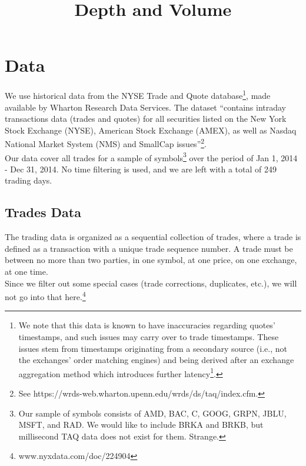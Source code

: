 \documentclass{article}
\begin{document}
\title{Depth and Volume}

\maketitle
\vspace{.5pc}

\section{Data}
We use historical data from the NYSE Trade and Quote database\footnote{We note that this data is known to have inaccuracies regarding quotes' timestamps, and such issues may carry over to trade timestamps. These issues stem from timestamps originating from a secondary source (i.e., not the exchanges' order matching engines) and being derived after an exchange aggregation method which introduces further latency\footnote{See Budish, Cramton and Shim (2015) and Ding, Hanna and Hendershott (2014)}.}, made available by Wharton Research Data Services. The dataset ``contains intraday transactions data (trades and quotes) for all securities listed on the New York Stock Exchange (NYSE), American Stock Exchange (AMEX), as well as Nasdaq National Market System (NMS) and SmallCap issues''\footnote{See https://wrds-web.wharton.upenn.edu/wrds/ds/taq/index.cfm.}.\\

Our data cover all trades for a sample of symbols\footnote{Our sample of symbols consists of AMD, BAC, C, GOOG, GRPN, JBLU, MSFT, and RAD. We would like to include BRKA and BRKB, but millisecond TAQ data does not exist for them. Strange.} over the period of Jan 1, 2014 - Dec 31, 2014. No time filtering is used, and we are left with a total of 249 trading days.\\

\subsection{Trades Data}
The trading data is organized as a sequential collection of trades, where a trade is defined as a transaction with a unique trade sequence number. A trade must be between no more than two parties, in one symbol, at one price, on one exchange, at one time.\\
Since we filter out some special cases (trade corrections, duplicates, etc.), we will not go into that here.\footnote{www.nyxdata.com/doc/224904}\\
\end{document}
